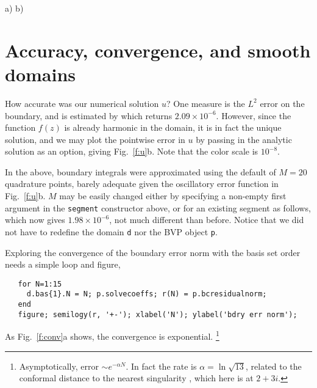 \bfi %
a)
b)
\efi

\section{Accuracy, convergence, and smooth domains}
\label{s:conv}

How accurate was our numerical solution $u$? One measure is the
$L^2$ error on the boundary, and is estimated by
which returns $2.09 \times 10^{-6}$.
However, since the function $f(z)$ is already harmonic in the domain,
it is in fact the unique solution, and we may plot the
pointwise error in $u$ by passing in the analytic solution as an option,
giving Fig.~\ref{f:u}b. Note that the color scale is $10^{-8}$.

In the above, boundary integrals were approximated using the default of
$M=20$ quadrature points, barely adequate given the
oscillatory error function in Fig.~\ref{f:u}b.
$M$ may be easily changed either by specifying
a non-empty first argument in the {\tt segment} constructor above, or
for an existing segment as follows,
which now gives $1.98\times 10^{-6}$, not much different than before.
Notice that we did not have to redefine the domain {\tt d} nor
the BVP object {\tt p}.

Exploring the convergence of the boundary error norm with the basis set order
needs a simple loop and figure,
\begin{verbatim}
   for N=1:15
     d.bas{1}.N = N; p.solvecoeffs; r(N) = p.bcresidualnorm;
   end
   figure; semilogy(r, '+-'); xlabel('N'); ylabel('bdry err norm');
\end{verbatim}
As Fig.~\ref{f:conv}a shows, the convergence is exponential.%
  \footnote{Asymptotically, error $\sim e^{-\alpha N}$. In fact the rate is
    $\alpha = \ln \sqrt{13}$, related to the conformal distance to
    the nearest singularity \cite{timothesis}, which here is at $2+3i$.}

